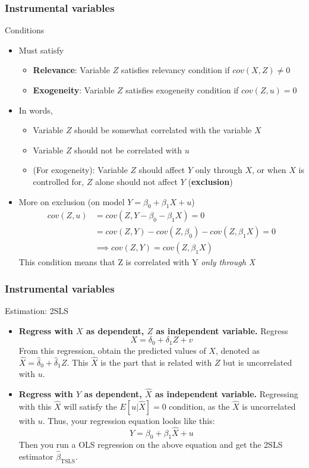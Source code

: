 \documentclass[compress]{beamer}
\begin{document}
\begin{frame}
\frametitle{Instrumental variables}
Conditions
\begin{itemize}
\item Must satisfy
\begin{itemize}
\item\textbf{Relevance}: Variable $Z$ satisfies relevancy condition if $cov(X,Z)\neq0$
\item\textbf{Exogeneity}: Variable $Z$ satisfies exogeneity condition if $cov(Z,u)=0$
\end{itemize}
\item In words, 
\begin{itemize}
\item Variable $Z$ should be somewhat correlated with the variable $X$
\item Variable $Z$ should not be correlated with $u$
\item (For exogeneity): Variable $Z$ should affect $Y$ only through $X$, or when $X$ is controlled for, $Z$ alone should not affect $Y$ (\textbf{exclusion})
\end{itemize}
\item More on exclusion (on model $Y=\beta_0+\beta_1X+u$)
\[
\begin{aligned}
cov(Z,u)&=cov(Z,Y-\beta_0-\beta_1X)=0\\
&=cov(Z,Y)-cov(Z,\beta_0)-cov(Z,\beta_1X)=0\\
&\implies cov(Z,Y)=cov(Z,\beta_1X)
\end{aligned}
\]
This condition means that Z is correlated with Y \textit{only through X}
\end{itemize}
\end{frame}

\begin{frame}
\frametitle{Instrumental variables}
Estimation: 2SLS
\begin{itemize}
\item \textbf{Regress with $X$ as dependent, $Z$ as independent variable.} Regress
\[
X=\delta_0 + \delta_1Z+v
\]
From this regression, obtain the predicted values of $X$, denoted as $\hat{X}=\hat{\delta}_0+\hat{\delta}_1Z$. This $\hat{X}$ is the part that is related with $Z$ but is uncorrelated with $u$.
\item \textbf{Regress with $Y$ as dependent, $\hat{X}$ as independent variable.} Regressing with this $\hat{X}$ will satisfy the $E[u|\hat{X}]=0$ condition, as the $\hat{X}$ is uncorrelated with $u$. Thus, your regression equation looks like this:
\[
Y=\beta_0+\beta_1\hat{X}+u
\]
Then you run a OLS regression on the above equation and get the 2SLS estimator $\hat{\beta}_{\text{TSLS}}$. 

\end{itemize}
\end{frame}
\end{document}
